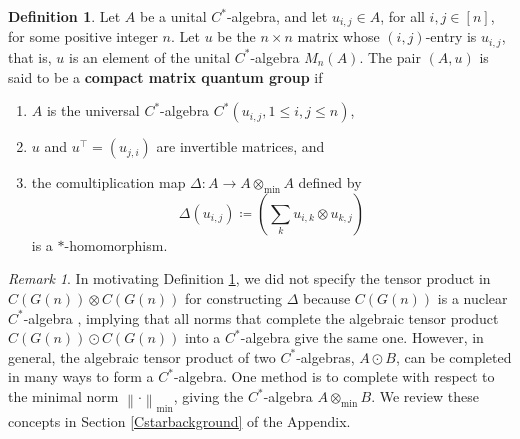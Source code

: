 \documentclass{article}
\theoremstyle{plain}
\theoremstyle{definition}
\newtheorem{definition}[theorem]{Definition}
\theoremstyle{remark}
\newtheorem{remark}[theorem]{Remark}
\newcommand{\norm}[1]{\left\lVert#1\right\rVert}
\begin{document}
\begin{definition} \label{CMQGDefn}
	Let $A$ be a unital $C^{*}$-algebra, and let $u_{i,j} \in A$, for all $i, j \in [n]$, for some positive integer $n$. 
	Let $u$ be the $n \times n$ matrix whose $(i,j)$-entry is $u_{i,j}$, that is, 
	$u$ is an element of the unital $C^{*}$-algebra $M_n(A)$.
	The pair $(A, u)$ is said to be
	a \textbf{compact matrix quantum group}
	if
	\begin{enumerate}
		\item $A$ is the universal $C^{*}$-algebra $C^{*}(u_{i,j}, 1 \leq i,j \leq n)$,
		\item $u$ and $u^\top = (u_{j,i})$ are invertible matrices, and
		\item the comultiplication map $\Delta: A \rightarrow A \otimes_{\min} A$ defined by
			\begin{equation} \label{deltadefn}
				\Delta(u_{i,j})
				\coloneqq
				\left(
				\sum_k 
				u_{i,k} \otimes u_{k,j}
				\right)
			\end{equation}
		is a $*$-homomorphism. 
	\end{enumerate}

\end{definition}

\begin{remark}
	In motivating Definition \ref{CMQGDefn},
	we did not specify the tensor product in $C(G(n)) \otimes C(G(n))$
	for constructing $\Delta$ because $C(G(n))$ is a nuclear $C^{*}$-algebra
	\citep[Proposition 10.10]{courtney2023notes},
	implying that all norms that complete the algebraic tensor product 
	$C(G(n)) \odot C(G(n))$ into a $C^{*}$-algebra give the same one.
	However, in general, the algebraic tensor product of two $C^{*}$-algebras, 
	$A \odot B$,
	can be completed in many ways to form a $C^{*}$-algebra. 
	One method is to complete with respect to the minimal norm $\norm{\cdot}_{\min}$,
	giving the $C^{*}$-algebra $A \otimes_{\min} B$.
	We review these concepts in Section \ref{Cstarbackground} of the Appendix.
\end{remark}
\end{document}
